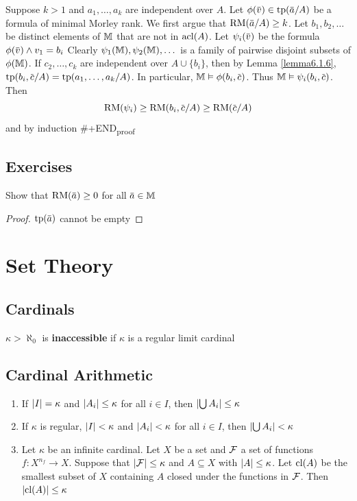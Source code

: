 \documentclass[11pt]{article}
\def \RM {\text{RM}}
\begin{document}
Suppose \(k>1\) and \(a_1,\dots,a_k\) are independent over \(A\). Let \(\phi(\barv)\in\tp(\bara/A)\) be a
formula of minimal Morley rank. We first argue that \(\RM(\bara/A)\ge k\). Let \(b_1,b_2,\dots\) be
distinct elements of \(\mathbb{M}\) that are not in \(\operatorname{acl}(A)\).
Let \(\psi_i(\barv)\) be the formula \(\phi(\barv)\wedge v_1=b_i\)
Clearly \(\psi_1(\mathbb{M}),\psi_2(\mathbb{M}),\dots\) is a family of pairwise disjoint subsets of \(\phi(\mathbb{M})\). If \(c_2,\dots,c_k\)
are independent over \(A\cup\{b_i\}\), then by Lemma
\ref{lemma6.1.6}, \(\tp(b_i,\barc/A)=\tp(a_1,\dots,a_k/A)\). In particular, \(\M\vDash\phi(b_i,\barc)\).
Thus \(\M\vDash\psi_i(b_i,\barc)\). Then
\begin{equation*}
\RM(\psi_i)\ge\RM(b_i,\barc/A)\ge\RM(\barc/A)
\end{equation*}
and by induction
\#+END\textsubscript{proof}


\subsection{Exercises}
\label{sec:org6645e09}
\begin{exercise}
\label{ex6.6.10}
Show that \(\RM(\bara)\ge 0\) for all \(\bara\in\M\)
\end{exercise}

\begin{proof}
\(\tp(\bara)\) cannot be empty
\end{proof}

\appendix
\section{Set Theory}
\label{sec:org6348c11}
\subsection{Cardinals}
\label{sec:org22ee380}
\(\kappa>\aleph_0\) is \textbf{inaccessible} if \(\kappa\) is a regular limit cardinal
\subsection{Cardinal Arithmetic}
\label{sec:orgd19d841}
\begin{corollary}[]
\label{corA.15} 
\begin{enumerate}
\item If \(\abs{I}=\kappa\) and \(\abs{A_i}\le\kappa\) for all \(i\in I\), then 
\(\abs{\bigcup A_i}\le\kappa\)
\item If \(\kappa\) is regular, \(\abs{I}<\kappa\) and \(\abs{A_i}<\kappa\) for all 
\(i\in I\), then \(\abs{\bigcup A_i}<\kappa\)
\item Let \(\kappa\) be an infinite cardinal. Let \(X\) be a set and \(\mathcal{F}\) a set of
functions \(f:X^{n_f}\to X\). Suppose that \(\abs{\calf}\le\kappa\) and
\(A\subseteq X\) with \(\abs{A}\le\kappa\). Let \(\operatorname{\text{cl}}(A)\) be the smallest
subset of \(X\) containing \(A\) closed under the functions in \(\mathcal{F}\). Then 
\(\abs{\cl(A)}\le\kappa\)
\end{enumerate}
\end{corollary}
\end{document}
